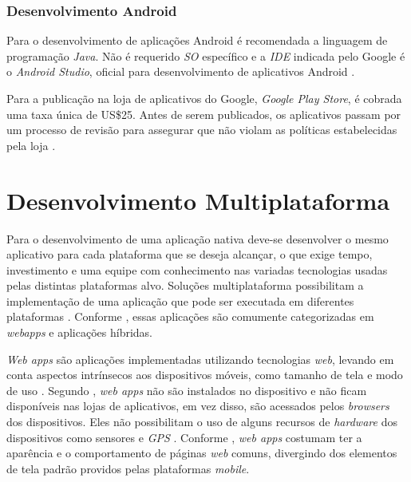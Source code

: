 \subsubsection{Desenvolvimento Android} \label{subsection:dev-android}

Para o desenvolvimento de aplicações Android é recomendada a  linguagem de programação \textit{Java}.
Não é requerido \textit{SO} específico e a \textit{IDE} indicada pelo Google é o \textit{Android Studio}, oficial para desenvolvimento de aplicativos Android \cite{android_meet_2016}.

Para a publicação na loja de aplicativos do Google, \textit{Google Play Store}, é cobrada uma taxa única de US\$25. 
Antes de serem publicados, os aplicativos passam por um processo de revisão para assegurar que não violam as políticas estabelecidas pela loja \cite{meier_creating_2015}.  

\section{Desenvolvimento Multiplataforma} \label{section:desenvolvimentomulti}
Para o desenvolvimento de uma aplicação nativa deve-se desenvolver o mesmo aplicativo para cada plataforma que se deseja alcançar,
o que exige tempo, investimento e uma equipe com conhecimento nas variadas tecnologias usadas pelas distintas plataformas alvo.
Soluções multiplataforma possibilitam a implementação de uma aplicação que pode ser executada em diferentes plataformas \cite{kassas_taxonomy_2015}. 
Conforme , essas aplicações são comumente categorizadas em \textit{webapps} e aplicações híbridas.

\textit{Web apps} são aplicações implementadas utilizando tecnologias \textit{web}, levando em conta aspectos intrínsecos aos dispositivos móveis, 
como tamanho de tela e modo de uso \cite{heitkotter_evaluating_2013}. Segundo , \textit{web apps} não são instalados 
no dispositivo e não ficam disponíveis nas lojas de aplicativos, em vez disso, são acessados pelos \textit{browsers} dos dispositivos. Eles 
não possibilitam o uso de alguns recursos de \textit{hardware} dos dispositivos como sensores e \textit{GPS} \cite{heitkotter_evaluating_2013}. 
Conforme , \textit{web apps} costumam ter a aparência e o comportamento de páginas \textit{web} comuns, 
divergindo dos elementos de tela padrão providos pelas plataformas \textit{mobile}.


